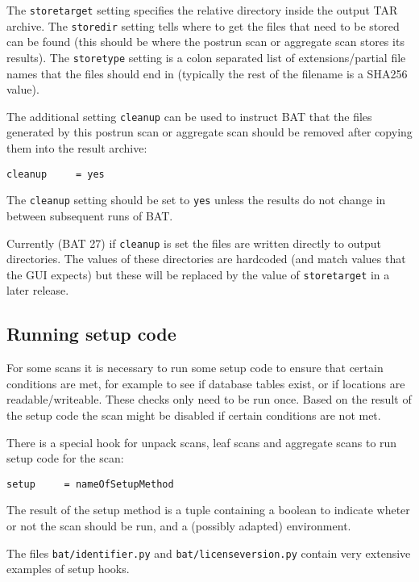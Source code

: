 \documentclass[10pt,a4paper]{article}
\begin{document}
The \texttt{storetarget} setting specifies the relative directory inside the
output TAR archive. The \texttt{storedir} setting tells where to get the files
that need to be stored can be found (this should be where the postrun scan
or aggregate scan stores its results). The \texttt{storetype} setting is a colon
separated list of extensions/partial file names that the files should end in
(typically the rest of the filename is a SHA256 value).

The additional setting \texttt{cleanup} can be used to instruct BAT that the
files generated by this postrun scan or aggregate scan should be removed after
copying them into the result archive:

\begin{verbatim}
cleanup     = yes
\end{verbatim}

The \texttt{cleanup} setting should be set to \texttt{yes} unless the results
do not change in between subsequent runs of BAT.

Currently (BAT 27) if \texttt{cleanup} is set the files are written directly to
output directories. The values of these directories are hardcoded (and match
values that the GUI expects) but these will be replaced by the value of
\texttt{storetarget} in a later release.

\subsection{Running setup code}

For some scans it is necessary to run some setup code to ensure that certain
conditions are met, for example to see if database tables exist, or if locations
are readable/writeable. These checks only need to be run once. Based on the
result of the setup code the scan might be disabled if certain conditions are
not met.

There is a special hook for unpack scans, leaf scans and aggregate scans to run
setup code for the scan:

\begin{verbatim}
setup     = nameOfSetupMethod
\end{verbatim}

The result of the setup method is a tuple containing a boolean to indicate
wheter or not the scan should be run, and a (possibly adapted) environment.

The files \texttt{bat/identifier.py} and \texttt{bat/licenseversion.py} contain
very extensive examples of setup hooks.
\end{document}
